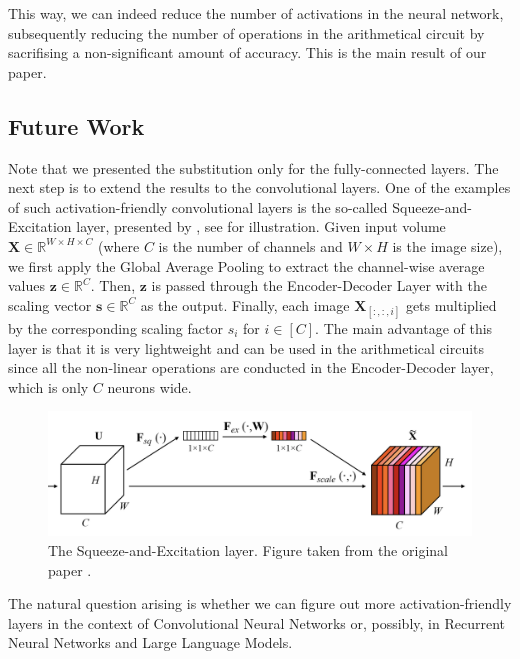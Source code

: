 \documentclass{iacrtrans}
\begin{document}
This way, we can indeed reduce the number of activations in the neural network, 
subsequently reducing the number of operations in the arithmetical circuit by 
sacrifising a non-significant amount of accuracy. This is the main result of our paper.

\subsection{Future Work}

Note that we presented the substitution only for the fully-connected layers. The
next step is to extend the results to the convolutional layers. One of the
examples of such activation-friendly convolutional layers is the so-called
Squeeze-and-Excitation layer, presented by \cite{se-network}, see
 for illustration. Given input volume $\mathbf{X} \in
\mathbb{R}^{W \times H \times C}$ (where $C$ is the number of channels and $W
\times H$ is the image size), we first apply the Global Average Pooling to
extract the channel-wise average values $\mathbf{z} \in \mathbb{R}^C$. Then,
$\mathbf{z}$ is passed through the Encoder-Decoder Layer with the scaling vector
$\mathbf{s} \in \mathbb{R}^C$ as the output. Finally, each image
$\mathbf{X}_{[:,:,i]}$ gets multiplied by the corresponding scaling factor $s_i$
for $i \in [C]$. The main advantage of this layer is that it is very lightweight
and can be used in the arithmetical circuits since all the non-linear operations
are conducted in the Encoder-Decoder layer, which is only $C$ neurons wide.

\begin{figure}
    \centering
    \includegraphics[width=\textwidth]{figures/se.png}
    \caption{The Squeeze-and-Excitation layer. Figure taken from 
    the original paper \cite{se-network}.}
    \label{figure:se}
\end{figure}

The natural question arising is whether we can figure out more
activation-friendly layers in the context of Convolutional Neural Networks or,
possibly, in Recurrent Neural Networks and Large Language Models.
\end{document}
